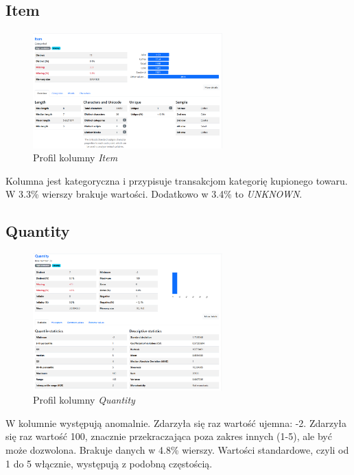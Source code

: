 \documentclass[a4paper,12pt]{article}
\begin{document}
\subsection{Item}

\begin{figure}[H]
  \centering
  \includegraphics[width=0.65\textwidth]{images/py_2.png}
  \caption{Profil kolumny \textit{Item}}
\end{figure}

Kolumna jest kategoryczna i przypisuje transakcjom kategorię kupionego towaru. W 3.3\% wierszy brakuje wartości. Dodatkowo w 3.4\% to \textit{UNKNOWN}.

\subsection{Quantity}

\begin{figure}[H]
  \centering
  \includegraphics[width=0.65\textwidth]{images/py_3.png}
  \caption{Profil kolumny \textit{Quantity}}
\end{figure}

W kolumnie występują anomalnie. Zdarzyła się raz wartość ujemna: -2. Zdarzyła się raz wartość 100, znacznie przekraczająca poza zakres innych (1-5), ale być może dozwolona. Brakuje danych w 4.8\% wierszy. Wartości standardowe, czyli od 1 do 5 włącznie, występują z podobną częstością.
\end{document}
